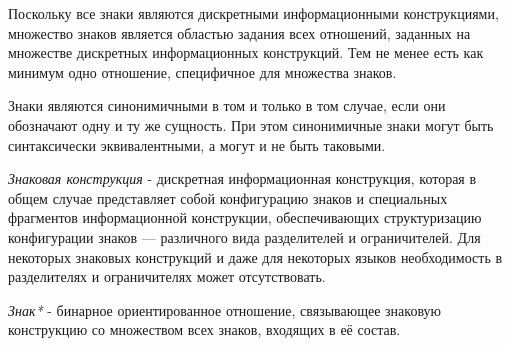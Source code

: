 Поскольку все знаки являются дискретными информационными конструкциями, множество знаков является областью задания всех отношений, заданных на множестве дискретных информационных конструкций.
Тем не менее есть как минимум одно отношение, специфичное для множества знаков.

\begin{SCn}


\end{SCn}

Знаки являются синонимичными в том и только в том случае, если они обозначают одну и ту же сущность. При этом синонимичные знаки могут быть синтаксически эквивалентными, а могут и не быть таковыми.

\begin{SCn}


\end{SCn}

\textit{Знаковая конструкция} - дискретная информационная конструкция, которая в общем случае представляет собой конфигурацию знаков и специальных фрагментов информационной конструкции, обеспечивающих структуризацию конфигурации знаков — различного вида разделителей и ограничителей. Для некоторых знаковых конструкций и даже для некоторых языков необходимость в разделителях и ограничителях может отсутствовать.

\begin{SCn}

        \begin{scnindent}
        \end{scnindent}

\end{SCn}

\textit{Знак*} - бинарное ориентированное отношение, связывающее знаковую конструкцию со множеством всех знаков, входящих в её состав.

